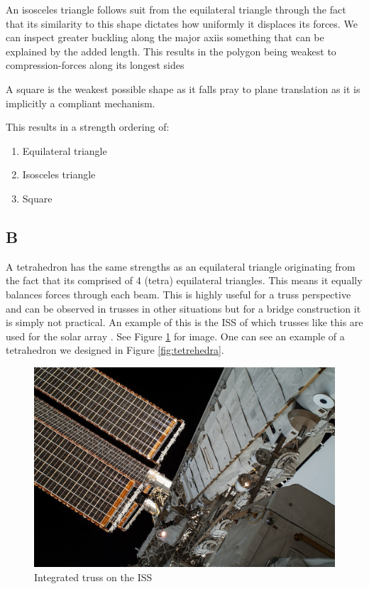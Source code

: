 \documentclass{report}
\begin{document}
An isosceles triangle follows suit from the equilateral triangle through the fact that its similarity to this shape dictates how uniformly it displaces its forces. We can inspect greater buckling along the major axiis something that can be explained by the added length. This results in the polygon being weakest to compression-forces along its longest sides

A square is the weakest possible shape as it falls pray to plane translation as it is implicitly a compliant mechanism.

This results in a strength ordering of:

\begin{enumerate}
	\item Equilateral triangle
	\item Isosceles triangle
	\item Square
\end{enumerate}

\subsection{B}

A tetrahedron has the same strengths as an equilateral triangle originating from the fact that its comprised of 4 (tetra) equilateral triangles. This means it equally balances forces through each beam. This is highly useful for a truss perspective and can be observed in trusses in other situations but for a bridge construction it is simply not practical. An example of this is the ISS of which trusses like this are used for the solar array \cite{wiki:itruss}. See Figure \ref{fig:itruss} for image. One can see an example of a tetrahedron we designed in Figure \ref{fig:tetrehedra}.

\begin{figure}[H]
	\centering
	\includegraphics[width=.8\linewidth]{iss-thruss}
	\caption{Integrated truss on the ISS}
	\label{fig:itruss}
\end{figure}
\end{document}
